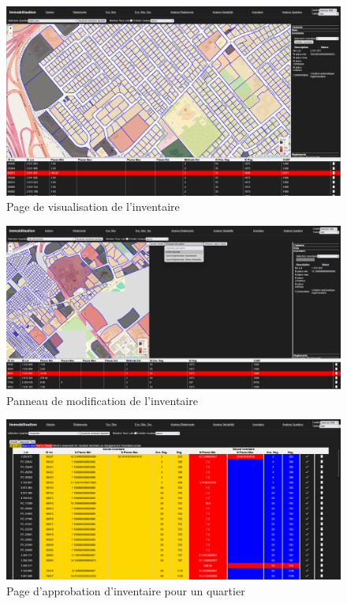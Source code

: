 \begin{landscape}
  \begin{figure}
    \centering
    \includegraphics[width=1\linewidth]{images/PageInventaire.png}
    \caption{Page de visualisation de l'inventaire}
    \label{fig:page-vis-inventaire}
\end{figure}  
\end{landscape}
\begin{landscape}
    \begin{figure}
        \centering
        \includegraphics[width=1\linewidth]{images/PageModifInventaire.png}
        \caption{Panneau de modification de l'inventaire}
        \label{fig:page-inventaire-modif}
    \end{figure}
\end{landscape}

\begin{landscape}
    \begin{figure}
        \centering
        \includegraphics[width=1\linewidth]{images/ApprobationInventaireQuartier.png}
        \caption{Page d'approbation d'inventaire pour un quartier}
        \label{fig:page-approb-inventaire-quartier}
    \end{figure}
\end{landscape}

